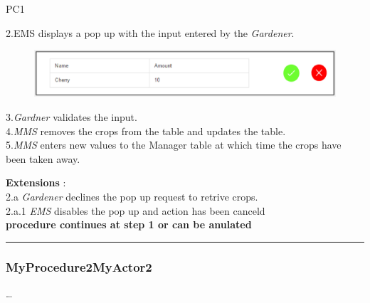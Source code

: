 \begin{lyxlist}{PC1}
{ 2.{EMS} displays a pop up with the input entered by the \emph{Gardener}.\\
\begin{figure}
\includegraphics[width=1\textwidth]{images/PopUpRetrive.eps}
\end{figure}
3.\emph{Gardner} validates the input.\\
4.\emph{MMS} removes the crops from the table and updates the table.\\
5.\emph{MMS} enters new values to the Manager table at which time the crops
have been taken away.\\
\item [\textbf{Extensions}]:\\
2.a  \emph{Gardener} declines the pop up request to retrive crops.\\
\hspace*{0.5cm} 2.a.1 \emph{EMS}  disables the pop up and action has been
canceld\\
\hspace*{0.5cm} \textbf{procedure continues at step 1 or can be anulated}
\item 
}
\end{lyxlist}
\hrule
\vspace{0.5cm}


\break
\subsubsection{MyProcedure2MyActor2}
\ldots














